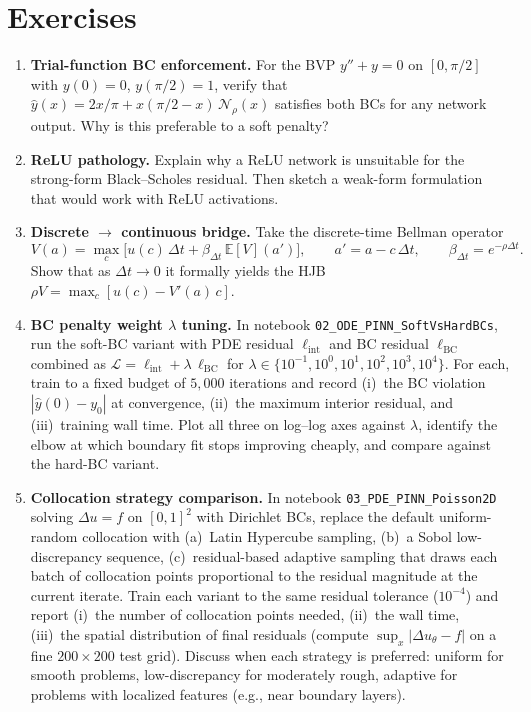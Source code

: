 \documentclass[11pt,a4paper]{report}
\newcommand{\E}[1]{\mathbb{E}\!\left[#1\right]}
\begin{document}
\section*{Exercises}
\begin{enumerate}[itemsep=4pt, leftmargin=*]
\item\label{ex:ch7:1} \textbf{Trial-function BC enforcement.}  For the BVP $y'' + y = 0$ on $[0,\pi/2]$ with $y(0)=0$, $y(\pi/2)=1$, verify that $\hat y(x) = 2x/\pi + x(\pi/2-x)\,\mathcal{N}_\rho(x)$ satisfies both BCs for any network output.  Why is this preferable to a soft penalty?
\item\label{ex:ch7:2} \textbf{ReLU pathology.}  Explain why a ReLU network is unsuitable for the strong-form Black--Scholes residual.  Then sketch a weak-form formulation that would work with ReLU activations.
\item\label{ex:ch7:3} \textbf{Discrete $\to$ continuous bridge.}  Take the discrete-time Bellman operator
\[
V(a) = \max_c \bigl[u(c)\,\Delta t + \beta_{\Delta t}\,\E V(a')\bigr],
\qquad
a' = a - c\,\Delta t,
\qquad
\beta_{\Delta t}=e^{-\rho\Delta t}.
\]
Show that as $\Delta t \to 0$ it formally yields the HJB $\rho V = \max_c [u(c) - V'(a)\,c]$.
\item\label{ex:ch7:4} \textbf{BC penalty weight $\lambda$ tuning.}  In notebook \texttt{02\_ODE\_PINN\_SoftVsHardBCs}, run the soft-BC variant with PDE residual $\ell_\mathrm{int}$ and BC residual $\ell_\mathrm{BC}$ combined as $\mathcal{L} = \ell_\mathrm{int} + \lambda\,\ell_\mathrm{BC}$ for $\lambda \in \{10^{-1}, 10^0, 10^1, 10^2, 10^3,10^4\}$.  For each, train to a fixed budget of $5{,}000$ iterations and record (i)~the BC violation $|\hat y(0) - y_0|$ at convergence, (ii)~the maximum interior residual, and (iii)~training wall time.  Plot all three on log--log axes against $\lambda$, identify the elbow at which boundary fit stops improving cheaply, and compare against the hard-BC variant.
\item\label{ex:ch7:5} \textbf{Collocation strategy comparison.}  In notebook \texttt{03\_PDE\_PINN\_Poisson2D} solving $\Delta u = f$ on $[0,1]^2$ with Dirichlet BCs, replace the default uniform-random collocation with (a)~Latin Hypercube sampling, (b)~a Sobol low-discrepancy sequence, (c)~residual-based adaptive sampling that draws each batch of collocation points proportional to the residual magnitude at the current iterate.  Train each variant to the same residual tolerance ($10^{-4}$) and report (i)~the number of collocation points needed, (ii)~the wall time, (iii)~the spatial distribution of final residuals (compute $\sup_x |\Delta u_\theta - f|$ on a fine $200\times 200$ test grid).  Discuss when each strategy is preferred: uniform for smooth problems, low-discrepancy for moderately rough, adaptive for problems with localized features (e.g., near boundary layers).

\end{enumerate}
\end{document}
